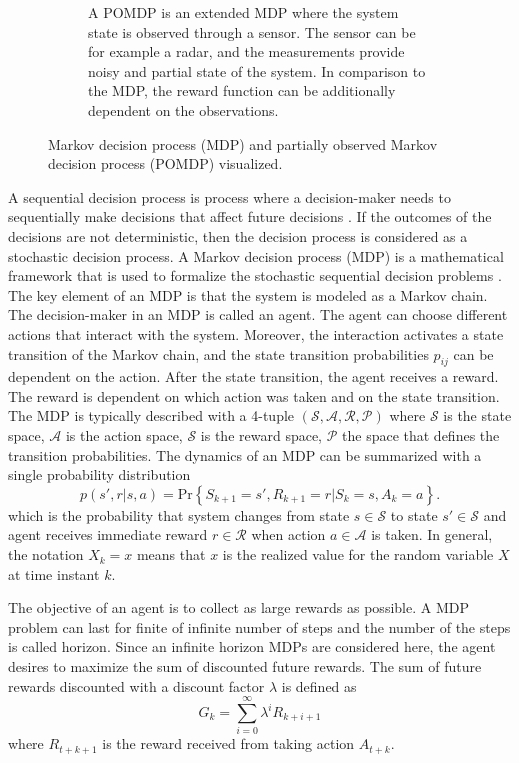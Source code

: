 \documentclass[english, 12pt, a4paper, elec, utf8, a-1b, online]{aaltothesis}
\newcommand{\Ss}{\mathcal{S}}
\newcommand{\As}{\mathcal{A}}
\newcommand{\Rs}{\mathcal{R}}
\newcommand{\Ps}{\mathcal{P}}
\renewcommand{\Pr}[1]{\text{Pr}\left\{ #1 \right\}}
\begin{document}
\begin{figure}
\begin{subfigure}[b]{0.45\textwidth}
        \caption{
        A POMDP is an extended MDP where the system state is observed through a sensor.
        The sensor can be for example a radar, and the measurements provide noisy and partial state of the system. 
        In comparison to the MDP, the reward function can be additionally dependent on the observations.
        }
        \label{fig:pomdp}
    \end{subfigure}
    \caption{Markov decision process (MDP) and partially observed Markov decision process (POMDP) visualized. }
    \label{fig:my_label}
\end{figure}

A sequential decision process is process where a decision-maker needs to sequentially make decisions that affect future decisions \cite{LaValle2006}.
If the outcomes of the decisions are not deterministic, then the decision process is considered as a stochastic decision process.
A Markov decision process (MDP) is a mathematical framework that is used to formalize the stochastic sequential decision problems \cite{Sutton2018}.
The key element of an MDP is that the system is modeled as a Markov chain.
The decision-maker in an MDP is called an agent.
The agent can choose different actions that interact with the system.
Moreover, the interaction activates a state transition of the Markov chain, and the state transition probabilities $p_{ij}$ can be dependent on the action.
After the state transition, the agent receives a reward.
The reward is dependent on which action was taken and on the state transition.
The MDP is typically described with a 4-tuple $\left( \Ss, \As, \Rs, \Ps \right)$ where $\Ss$ is the state space, $\As$ is the action space, $\Ss$ is the reward space, $\Ps$ the space that defines the transition probabilities.
The dynamics of an MDP can be summarized with a single probability distribution
\begin{equation}\label{eq:MDP_probs}
    p(s', r | s, a) = \Pr{ S_{k+1}=s', R_{k+1}=r | S_k=s, A_k=a }.
\end{equation}
which is the probability that system changes from state $s \in \Ss$ to state $s' \in \Ss$ and agent receives immediate reward $r \in \Rs$ when action $a \in \As$ is taken.
In general, the notation $X_{k}=x$ means that $x$ is the realized value for the random variable $X$ at time instant $k$.  

The objective of an agent is to collect as large rewards as possible.
A MDP problem can last for finite of infinite number of steps and the number of the steps is called horizon.  
Since an infinite horizon MDPs are considered here, the agent desires to maximize the sum of discounted future rewards.
The sum of future rewards discounted with a discount factor $\lambda$ is defined as
\begin{equation}\label{eq:discounted_sum}
    G_k = \sum_{i=0}^{\infty} \lambda^i R_{k + i + 1}
\end{equation}
where $R_{t+k+1}$ is the reward received from taking action $A_{t+k}$. 
\end{document}
